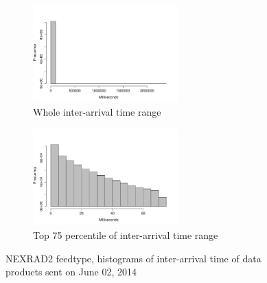 \begin{figure}[htb!]
\centering
    \begin{subfigure}{0.5\linewidth}
        \centering
        \includegraphics[width=2.2in]{figures/Inter-hist-NEXRAD20602.pdf}
        \caption{Whole inter-arrival time range}
        \label{NEXRAD2_Inter_Whole}
    \end{subfigure}\hfill
    \begin{subfigure}{0.5\linewidth}
	\centering
    \includegraphics[width=2.2in]{figures/Inter-hist-NEXRAD20602-TOP75.pdf}
        \caption{Top 75 percentile of inter-arrival time range}
        \label{NEXRAD2_Inter_75}
    \end{subfigure}\hfill
    \caption{NEXRAD2 feedtype, histograms of inter-arrival time of data products sent on June 02, 2014}
    \label{NEXRAD2_time}
\end{figure}

